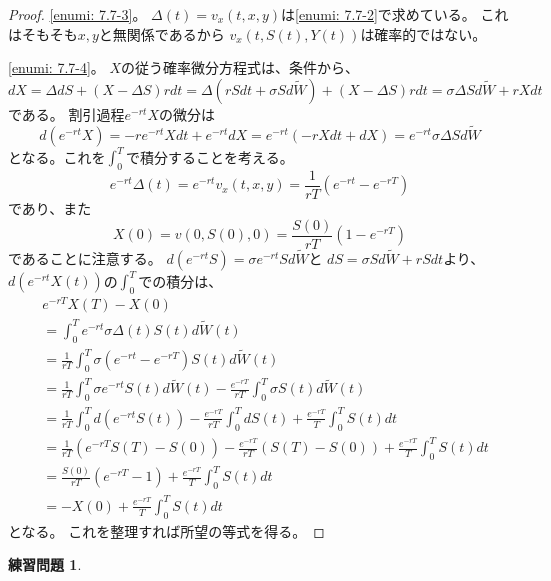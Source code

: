 \documentclass[uplatex]{jsarticle}
\theoremstyle{definition}
\newtheorem{prob}[prob]{練習問題}
\begin{document}
\begin{proof}
  \ref{enumi: 7.7-3}。
  \(\Delta(t) = v_x(t,x,y)\)は\ref{enumi: 7.7-2}で求めている。
  これはそもそも\(x,y\)と無関係であるから
  \(v_x(t,S(t),Y(t))\)は確率的ではない。

  \ref{enumi: 7.7-4}。
  \(X\)の従う確率微分方程式は、条件から、
  \[
  dX = \Delta dS + (X-\Delta S)rdt
  = \Delta ( rSdt + \sigma Sd\tilde{W}) + (X-\Delta S)rdt
  = \sigma \Delta S d\tilde{W} + rXdt
  \]
  である。
  割引過程\(e^{-rt}X\)の微分は
  \[
  d(e^{-rt}X) = -re^{-rt}Xdt + e^{-rt}dX
  = e^{-rt}(-rXdt + dX)
  = e^{-rt}\sigma \Delta Sd\tilde{W}
  \]
  となる。これを\(\int_0^T\)で積分することを考える。
  \[
  e^{-rt}\Delta(t) = e^{-rt}v_x(t,x,y)
  = \frac{1}{rT}\left( e^{-rt}-e^{-rT} \right)
  \]
  であり、また
  \[
  X(0) = v(0,S(0),0) = \frac{S(0)}{rT}\left( 1-e^{-rT}\right)
  \]
  であることに注意する。
  \(d(e^{-rt}S) = \sigma e^{-rt}Sd\tilde{W}\)と
  \(dS = \sigma S d\tilde{W} + rSdt\)より、
  \(d\left( e^{-rt}X(t) \right)\)の\(\int_0^T\)での積分は、
  \begin{align*}
    &e^{-rT}X(T) - X(0)  \\
    &= \int_0^T e^{-rt}\sigma \Delta(t) S(t) d\tilde{W}(t) \\
    &= \frac{1}{rT} \int_0^T \sigma
    \left( e^{-rt}-e^{-rT} \right) S(t) d\tilde{W}(t) \\
    &= \frac{1}{rT} \int_0^T \sigma e^{-rt}S(t) d\tilde{W}(t)
    - \frac{e^{-rT}}{rT} \int_0^T \sigma S(t) d\tilde{W}(t) \\
    &= \frac{1}{rT} \int_0^T d(e^{-rt}S(t))
    - \frac{e^{-rT}}{rT} \int_0^T dS(t)
    + \frac{e^{-rT}}{T} \int_0^T S(t) dt \\
    &= \frac{1}{rT} \left( e^{-rT}S(T) - S(0) \right)
    - \frac{e^{-rT}}{rT} \left( S(T) - S(0) \right)
    + \frac{e^{-rT}}{T} \int_0^T S(t) dt \\
    &= \frac{S(0)}{rT} \left( e^{-rT} - 1 \right)
    + \frac{e^{-rT}}{T} \int_0^T S(t) dt \\
    &= - X(0) + \frac{e^{-rT}}{T} \int_0^T S(t) dt
  \end{align*}
  となる。
  これを整理すれば所望の等式を得る。
\end{proof}







\begin{prob}\label{prob: 7.8}
\end{prob}
\end{document}
